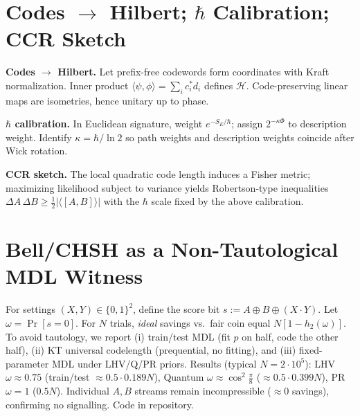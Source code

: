 \documentclass[aps,preprint,onecolumn,longbibliography,nofootinbib]{revtex4-2}
\numberwithin{equation}{section}        %
\begin{document}
\section{Codes $\to$ Hilbert; $\hbar$ Calibration; CCR Sketch}\label{app:Q}
\textbf{Codes $\to$ Hilbert.} Let prefix-free codewords form coordinates with Kraft normalization. Inner product $\langle \psi,\phi\rangle=\sum_i c_i^* d_i$ defines $\mathcal{H}$. Code-preserving linear maps are isometries, hence unitary up to phase.

\textbf{$\hbar$ calibration.} In Euclidean signature, weight $e^{-S_E/\hbar}$; assign $2^{-\kappa \Phi}$ to description weight. Identify $\kappa=\hbar/\ln 2$ so path weights and description weights coincide after Wick rotation.

\textbf{CCR sketch.} The local quadratic code length induces a Fisher metric; maximizing likelihood subject to variance yields Robertson-type inequalities $\Delta A\,\Delta B\ge \tfrac{1}{2}|\langle[A,B]\rangle|$ with the $\hbar$ scale fixed by the above calibration.

\section{Bell/CHSH as a Non-Tautological MDL Witness}\label{app:BELL}
For settings $(X,Y)\in\{0,1\}^2$, define the score bit $s:=A\oplus B\oplus (X\!\cdot\!Y)$. Let $\omega=\Pr[s=0]$. For $N$ trials, \emph{ideal} savings vs.\ fair coin equal $N[1-h_2(\omega)]$. To avoid tautology, we report (i) train/test MDL (fit $p$ on half, code the other half), (ii) KT universal codelength (prequential, no fitting), and (iii) fixed-parameter MDL under LHV/Q/PR priors. Results (typical $N\!=\!2\cdot 10^5$):
LHV $\omega{\approx}0.75$ (train/test $\approx 0.5\cdot 0.189 N$), Quantum $\omega{\approx}\cos^2\!\frac{\pi}{8}$ ($\approx 0.5\cdot 0.399 N$), PR $\omega{=}1$ ($0.5N$). Individual $A,B$ streams remain incompressible ($\approx 0$ savings), confirming no signalling. Code in repository.

\end{document}

